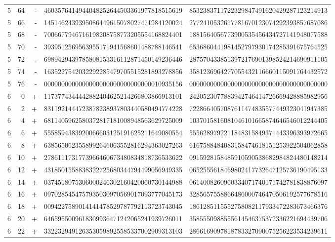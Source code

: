 \begin{longtable}{rrrll}
5 & 64 & - & 4603576414944048252644503361977818515619 & 8532383711722329847491620429287123214913 \\
5 & 66 & - & 1451462439395086449615078027471984120024 & 2772410532617781670123074292393857687086 \\
5 & 68 & - & 7006677946716198208758773205554168824401 & 1881564056773900535456434727141948077588 \\
5 & 70 & - & 3939512569563955171941568601488788146541 & 6536860441981452797930174285391675764525 \\
5 & 72 & - & 6989429439785808153316112871450149236446 & 2875704338513972176901398524214690911105 \\
5 & 74 & - & 1635227542032292285479705515281893278856 & 3581236964277055432116660115091764432572 \\
5 & 76 & - & 0000000000000000000000000000000010935156 & 0000000000000000000000000000000000000000 \\
6 & 0 & + & 1173774344442882404625214266803866913101 & 2420523077883942746414726669428885982956 \\
6 & 2 & + & 8311921444723878238937803440580494774228 & 7228664057087611474835577449323041947385 \\
6 & 4 & + & 6811405962580372817181008948563629725009 & 1037015816081046101665874646546012244405 \\
6 & 6 & + & 5558594383920066603125191625211649080554 & 5556289792211848315849371443396393972665 \\
6 & 8 & + & 6385650623558992646063552816294363027263 & 6167588484083158474618151253922504062858 \\
6 & 10 & + & 2786111731773966460673480834818736533622 & 0915928158485910590538682984824480148214 \\
6 & 12 & + & 4318501558838322725680344794499056949335 & 0652555618469802417732647125736190495133 \\
6 & 14 & + & 0374518075306000246302160420060730144988 & 0614008260960334071740171742781838876097 \\
6 & 16 & + & 0970285454757935030970569017093777045173 & 3285657558866486000746470506192577678516 \\
6 & 18 & + & 0094227589014141478529787792113723743045 & 1861285115552758082117933472283673466376 \\
6 & 20 & + & 6465955009618309936471242065241939726011 & 3585550988555614546375372336221694439706 \\
6 & 22 & + & 3322329491263530598925585337002909313103 & 2866169097818783327090075256223534239611 \\

\end{longtable}
